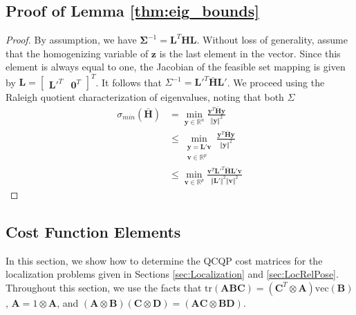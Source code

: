 \documentclass[lettersize,journal]{IEEEtran}
\newcommand{\vect}[1]{\mbox{vec}(#1)}
\newcommand{\tr}[1]{\mbox{tr}\left(#1\right)}
\begin{document}
\subsection{Proof of Lemma \ref{thm:eig_bounds}}\label{SM:lemma2Proof}

\begin{proof}
By assumption, we have $\bm{\Sigma}^{-1} = \bm{L}^T\bm{H}\bm{L}$. Without loss of generality, assume that the homogenizing variable of $\bm{z}$ is the last element in the vector. Since this element is always equal to one, the Jacobian of the feasible set mapping is given by $\bm{L} = \begin{bmatrix}
	\bm{L}'^T & \bm{0}^T
\end{bmatrix}^T$. It follows that ${\Sigma}^{-1} = \bm{L}'^T\bar{\bm{H}}\bm{L}'$.
We proceed using the Raleigh quotient characterization of eigenvalues, noting that both $\Sigma$
\begin{align*}
	\sigma_{min}(\bar{\bm{H}}) &= \min\limits_{\bm{y}\in\mathbb{R}^n} \frac{\bm{y}^T \bar{\bm{H}} \bm{y}}{\Vert\bm{y}\Vert^2} \\
	&\leq \min\limits_{\substack{\bm{y}=\bm{L}'\bm{v}\\\bm{v}\in\mathbb{R}^p}} \frac{\bm{y}^T \bar{\bm{H}} \bm{y}}{\Vert\bm{y}\Vert^2} \\ 
	&\leq \min\limits_{\bm{v}\in\mathbb{R}^p} \frac{\bm{v}^T \bm{L}'^T\bar{\bm{H}}\bm{L}' \bm{v}}{\Vert\bm{L}'\Vert^2\Vert\bm{v}\Vert^2 } 
\end{align*}

\end{proof}

\subsection{Cost Function Elements}\label{SM:LocCost}

In this section, we show how to determine the QCQP cost matrices for the localization problems given in Sections \ref{sec:Localization} and \ref{sec:LocRelPose}. Throughout this section, we use the facts that $ \tr{\bm{A}\bm{B}\bm{C}} = (\bm{C}^T\otimes\bm{A}) \vect{\bm{B}}$, $ \bm{A} = 1\otimes\bm{A} $, and $ (\bm{A}\otimes\bm{B})(\bm{C}\otimes\bm{D}) = (\bm{AC}\otimes\bm{BD}) $\cite{magnusMatrixDifferentialCalculus2019}. 
\end{document}
